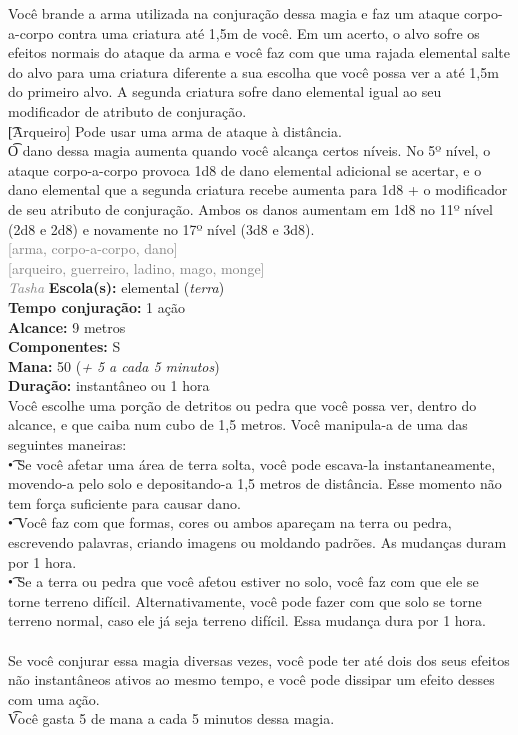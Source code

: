 \documentclass{RPG_Adventure}[2021/10/20]
\begin{document}
{\normalsize Você brande a arma utilizada na conjuração dessa magia e faz um ataque corpo-a-corpo contra uma criatura até 1,5m de você. Em um acerto, o alvo sofre os efeitos normais do ataque da arma e você faz com que uma rajada elemental salte do alvo para uma criatura diferente a sua escolha que você possa ver a até 1,5m do primeiro alvo. A segunda criatura sofre dano elemental igual ao seu modificador de atributo de conjuração.\\\t [Arqueiro] Pode usar uma arma de ataque à distância.\\\t O dano dessa magia aumenta quando você alcança certos níveis. No 5º nível, o ataque corpo-a-corpo provoca 1d8 de dano elemental adicional se acertar, e o dano elemental que a segunda criatura recebe aumenta para 1d8 + o modificador de seu atributo de conjuração. Ambos os danos aumentam em 1d8 no 11º nível (2d8 e 2d8) e novamente no 17º nível (3d8 e 3d8).\\}
{\scriptsize \textcolor{gray}{[arma, corpo-a-corpo, dano]\\}}
{\scriptsize \textcolor{gray}{[arqueiro, guerreiro, ladino, mago, monge]\\}}
{\tiny \textcolor{gray}{\textit{Tasha}}}\jump{}
{\small \t \textbf{Escola(s):} elemental (\textit{terra})\\\t \textbf{Tempo conjuração:} 1 ação\\\t \textbf{Alcance:} 9 metros\\\t \textbf{Componentes:} S\\\t \textbf{Mana:} 50 (\textit{+ 5 a cada 5 minutos})\\\t \textbf{Duração:} instantâneo ou 1 hora\\}
{\normalsize Você escolhe uma porção de detritos ou pedra que você possa ver, dentro do alcance, e que caiba num cubo de 1,5 metros. Você manipula-a de uma das seguintes maneiras: \\\t • Se você afetar uma área de terra solta, você pode escava-la instantaneamente, movendo-a pelo solo e depositando-a 1,5 metros de distância. Esse momento não tem força suficiente para causar dano.\\\t • Você faz com que formas, cores ou ambos apareçam na terra ou pedra, escrevendo palavras, criando imagens ou moldando padrões. As mudanças duram por 1 hora.\\\t • Se a terra ou pedra que você afetou estiver no solo, você faz com que ele se torne terreno difícil. Alternativamente, você pode fazer com que solo se torne terreno normal, caso ele já seja terreno difícil. Essa mudança dura por 1 hora.\\\\Se você conjurar essa magia diversas vezes, você pode ter até dois dos seus efeitos não instantâneos ativos ao mesmo tempo, e você pode dissipar um efeito desses com uma ação.\\\t Você gasta 5 de mana a cada 5 minutos dessa magia.\\}
\end{document}
